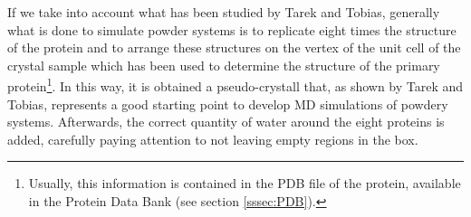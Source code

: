 If we take into account what has been studied by Tarek and Tobias, generally what is done to simulate powder systems is to replicate eight times the structure of the protein and to arrange these structures on the vertex of the unit cell of the crystal sample which has been used to determine the structure of the primary protein\footnote{Usually, this information is contained in the PDB file of the protein, available in the Protein Data Bank (see section \ref{sssec:PDB}).}. In this way, it is obtained a pseudo-crystall that, as shown by Tarek and Tobias, represents a good starting point to develop MD simulations of powdery systems. Afterwards, the correct quantity of water around the eight proteins is added, carefully paying attention to not leaving empty regions in the box.


